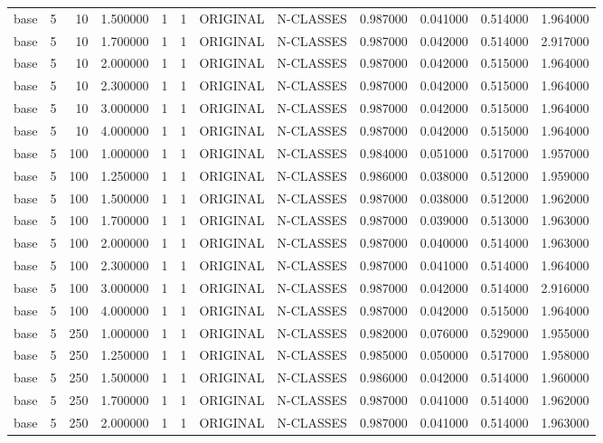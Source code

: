 \begin{tabular}{lrrrllllrrrr}
base & 5 & 10 & 1.500000 & 1 & 1 & ORIGINAL & N-CLASSES & 0.987000 & 0.041000 & 0.514000 & 1.964000 \\
base & 5 & 10 & 1.700000 & 1 & 1 & ORIGINAL & N-CLASSES & 0.987000 & 0.042000 & 0.514000 & 2.917000 \\
base & 5 & 10 & 2.000000 & 1 & 1 & ORIGINAL & N-CLASSES & 0.987000 & 0.042000 & 0.515000 & 1.964000 \\
base & 5 & 10 & 2.300000 & 1 & 1 & ORIGINAL & N-CLASSES & 0.987000 & 0.042000 & 0.515000 & 1.964000 \\
base & 5 & 10 & 3.000000 & 1 & 1 & ORIGINAL & N-CLASSES & 0.987000 & 0.042000 & 0.515000 & 1.964000 \\
base & 5 & 10 & 4.000000 & 1 & 1 & ORIGINAL & N-CLASSES & 0.987000 & 0.042000 & 0.515000 & 1.964000 \\
base & 5 & 100 & 1.000000 & 1 & 1 & ORIGINAL & N-CLASSES & 0.984000 & 0.051000 & 0.517000 & 1.957000 \\
base & 5 & 100 & 1.250000 & 1 & 1 & ORIGINAL & N-CLASSES & 0.986000 & 0.038000 & 0.512000 & 1.959000 \\
base & 5 & 100 & 1.500000 & 1 & 1 & ORIGINAL & N-CLASSES & 0.987000 & 0.038000 & 0.512000 & 1.962000 \\
base & 5 & 100 & 1.700000 & 1 & 1 & ORIGINAL & N-CLASSES & 0.987000 & 0.039000 & 0.513000 & 1.963000 \\
base & 5 & 100 & 2.000000 & 1 & 1 & ORIGINAL & N-CLASSES & 0.987000 & 0.040000 & 0.514000 & 1.963000 \\
base & 5 & 100 & 2.300000 & 1 & 1 & ORIGINAL & N-CLASSES & 0.987000 & 0.041000 & 0.514000 & 1.964000 \\
base & 5 & 100 & 3.000000 & 1 & 1 & ORIGINAL & N-CLASSES & 0.987000 & 0.042000 & 0.514000 & 2.916000 \\
base & 5 & 100 & 4.000000 & 1 & 1 & ORIGINAL & N-CLASSES & 0.987000 & 0.042000 & 0.515000 & 1.964000 \\
base & 5 & 250 & 1.000000 & 1 & 1 & ORIGINAL & N-CLASSES & 0.982000 & 0.076000 & 0.529000 & 1.955000 \\
base & 5 & 250 & 1.250000 & 1 & 1 & ORIGINAL & N-CLASSES & 0.985000 & 0.050000 & 0.517000 & 1.958000 \\
base & 5 & 250 & 1.500000 & 1 & 1 & ORIGINAL & N-CLASSES & 0.986000 & 0.042000 & 0.514000 & 1.960000 \\
base & 5 & 250 & 1.700000 & 1 & 1 & ORIGINAL & N-CLASSES & 0.987000 & 0.041000 & 0.514000 & 1.962000 \\
base & 5 & 250 & 2.000000 & 1 & 1 & ORIGINAL & N-CLASSES & 0.987000 & 0.041000 & 0.514000 & 1.963000 \\

\end{tabular}
